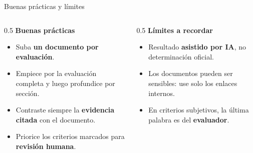 \documentclass[aspectratio=169,11pt]{beamer}
\newcommand{\redlead}[1]{\textbf{\color{iloRed}#1}}
\newcommand{\bluelead}[1]{\textbf{\color{iloBlue}#1}}
\begin{document}
\begin{frame}{Buenas prácticas y límites}
  \small
  \begin{columns}[T]
    \begin{column}{0.5\textwidth}
      \bluelead{Buenas prácticas}
      \begin{itemize}
        \item Suba \textbf{un documento por evaluación}.
        \item Empiece por la evaluación completa y luego profundice por sección.
        \item Contraste siempre la \textbf{evidencia citada} con el documento.
        \item Priorice los criterios marcados para \redlead{revisión humana}.
      \end{itemize}
    \end{column}
    \begin{column}{0.5\textwidth}
      \redlead{Límites a recordar}
      \begin{itemize}
        \item Resultado \textbf{asistido por IA}, no determinación oficial.
        \item Los documentos pueden ser sensibles: use solo los enlaces internos.
        \item En criterios subjetivos, la última palabra es del \bluelead{evaluador}.
      \end{itemize}
    \end{column}
  \end{columns}
\end{frame}
\end{document}
